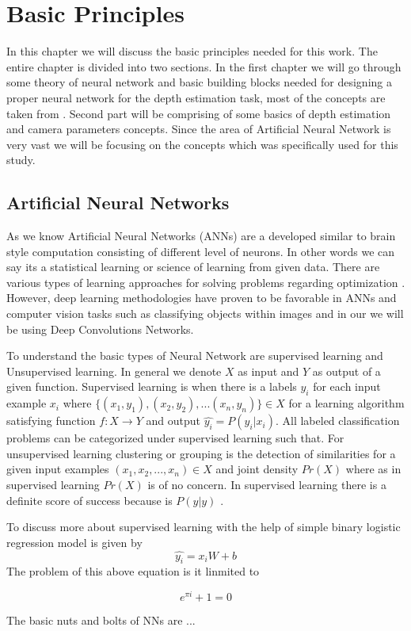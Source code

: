 
\chapter{Basic Principles}
\label{Chapter2:Background} 

In this chapter we will discuss the basic  principles needed for this work. The entire chapter is divided into two sections. In the first chapter we will go through some theory of neural network and basic building blocks  needed for designing a proper neural network for the depth estimation task, most of the concepts are taken from \cite{friedman2001elements}. Second part will be comprising of some basics of depth estimation and camera parameters concepts. Since the area of Artificial Neural Network is very vast we will be focusing on the concepts which was specifically used for this study. 

\section{Artificial Neural Networks}

As we know Artificial Neural Networks (ANNs) are a developed similar to brain style computation consisting of different level of neurons. In other words we can say its a statistical learning or science of learning from given data. There are various types of learning approaches for solving problems
regarding optimization \cite{friedman2001elements}. However, deep learning methodologies have proven to be favorable in ANNs and computer vision tasks such as classifying objects within images and in our we will be using Deep Convolutions Networks. 

To understand the basic types of Neural Network are supervised learning and Unsupervised learning. In general we denote \(X\) as input and \(Y\) as output of a given function. Supervised learning is when there is a labels \(y_{i}\) for each input example \(x_{i}\) where    \(\{(x_{1},y_{1}),(x_{2},y_{2}),...(x_{n},y_{n})\} \in X\) for a learning algorithm satisfying function \(f:X \rightarrow Y\) and output \( \hat{y_{i}} = P (y_{i}|x_{i})\). All labeled classification problems can be categorized under supervised learning such that. For  unsupervised learning clustering or grouping is the detection of similarities for a given input examples \({(x_{1},x_{2},...,x_{n})} \in X\) and joint density \(Pr(X)\)  where as in supervised learning \(Pr(X)\) is of no concern. In supervised learning there is a definite score of success because is \(P(y|y)\) \cite{friedman2001elements}. 

To discuss more about supervised learning with the help of simple binary logistic regression model is given by
\begin{equation} \label{eq1}
    \hat{y_{i}} = x_{i}W + b 
\end{equation}
The problem of this above equation is it linmited to 


\begin{equation} \label{eq2}
    e^{\pi i} + 1 = 0
\end{equation}

The basic nuts and bolts of NNs are ...